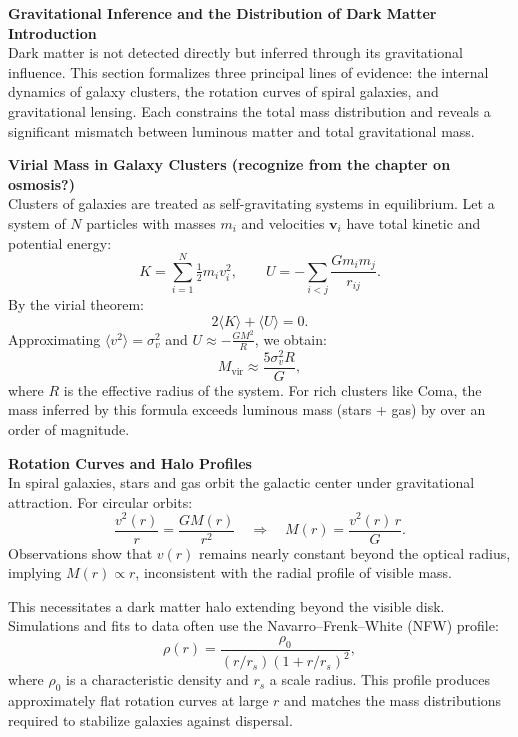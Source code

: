 \begin{technical}
{\Large\textbf{Gravitational Inference and the Distribution of Dark Matter}}\\[0.7em]

\noindent\textbf{Introduction}\\[0.5em]
Dark matter is not detected directly but inferred through its gravitational influence. This section formalizes three principal lines of evidence: the internal dynamics of galaxy clusters, the rotation curves of spiral galaxies, and gravitational lensing. Each constrains the total mass distribution and reveals a significant mismatch between luminous matter and total gravitational mass.

\noindent\textbf{Virial Mass in Galaxy Clusters (recognize from the chapter on osmosis?)}\\[0.5em]
Clusters of galaxies are treated as self-gravitating systems in equilibrium. Let a system of \( N \) particles with masses \( m_i \) and velocities \( \mathbf{v}_i \) have total kinetic and potential energy:
\[
K = \sum_{i=1}^N \tfrac{1}{2} m_i v_i^2, \qquad
U = - \sum_{i<j} \frac{G m_i m_j}{r_{ij}}.
\]
By the virial theorem:
\[
2\langle K \rangle + \langle U \rangle = 0.
\]
Approximating \( \langle v^2 \rangle = \sigma_v^2 \) and \( U \approx - \tfrac{G M^2}{R} \), we obtain:
\[
M_{\text{vir}} \approx \frac{5 \sigma_v^2 R}{G},
\]
where \( R \) is the effective radius of the system. For rich clusters like Coma, the mass inferred by this formula exceeds luminous mass (stars + gas) by over an order of magnitude.

\noindent\textbf{Rotation Curves and Halo Profiles}\\[0.5em]
In spiral galaxies, stars and gas orbit the galactic center under gravitational attraction. For circular orbits:
\[
\frac{v^2(r)}{r} = \frac{G M(r)}{r^2} \quad \Rightarrow \quad M(r) = \frac{v^2(r)\,r}{G}.
\]
Observations show that \( v(r) \) remains nearly constant beyond the optical radius, implying \( M(r) \propto r \), inconsistent with the radial profile of visible mass.

This necessitates a dark matter halo extending beyond the visible disk. Simulations and fits to data often use the Navarro–Frenk–White (NFW) profile:
\[
\rho(r) = \frac{\rho_0}{(r/r_s)(1 + r/r_s)^2},
\]
where \( \rho_0 \) is a characteristic density and \( r_s \) a scale radius. This profile produces approximately flat rotation curves at large \( r \) and matches the mass distributions required to stabilize galaxies against dispersal.


\end{technical}
